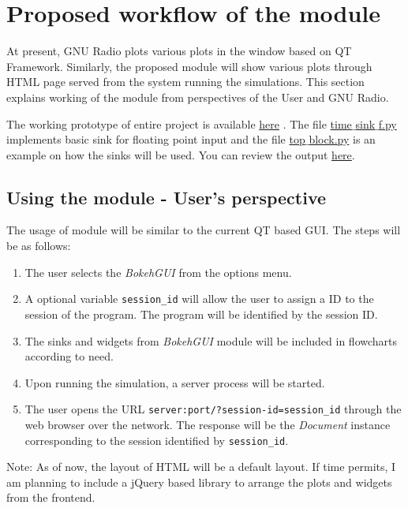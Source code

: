 \documentclass[a4paper, 11pt]{article}
\begin{document}
\section{Proposed workflow of the module}

At present, GNU Radio plots various plots in the window based on QT Framework. Similarly, the proposed module will show various plots through HTML page served from the system running the simulations. This section explains working of the module from perspectives of the User and GNU Radio.

The working prototype of entire project is available \href{https://github.com/kartikp1995/gr-htmlgui/}{here} \cite{htmlGui}. The file \href{https://github.com/kartikp1995/gr-htmlgui/blob/master/python/time_sink_f.py}{time$\_$sink$\_$f.py} implements basic sink for floating point input and the file \href{https://github.com/kartikp1995/gr-htmlgui/blob/master/examples/top_block.py}{top$\_$block.py} is an example on how the sinks will be used. You can review the output \href{http://terminal.kartikpatel.in:5006/?bokeh-session-id=h4NyPINXVEniemWudNItOhpEwM1U9NvoC3WaHu1Dmfyr}{here}.

\subsection{Using the module - User's perspective}
The usage of module will be similar to the current QT based GUI. The steps will be as follows:
\begin{enumerate}
\item The user selects the \textit{BokehGUI} from the options menu. 
\item A optional variable \texttt{session\_id} will allow the user to assign a ID to the session of the program. The program will be identified by the session ID.
\item The sinks and widgets from \textit{BokehGUI} module will be included in flowcharts according to need.
\item Upon running the simulation, a server process will be started.
\item The user opens the URL \texttt{server:port/?session-id=session\_id} through the web browser over the network. The response will be the \textit{Document} instance corresponding to the session identified by \texttt{session\_id}.
\end{enumerate}
Note: As of now, the layout of HTML will be a default layout. If time permits, I am planning to include a jQuery based library \cite{arrange} to arrange the plots and widgets from the frontend.
\end{document}
